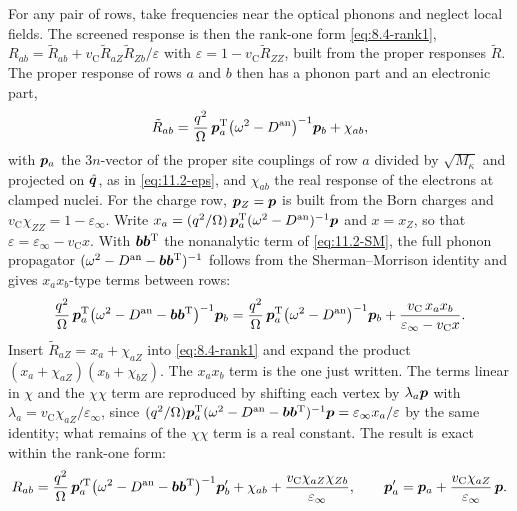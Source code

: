 For any pair of rows, take frequencies near the optical phonons and neglect local fields. The screened response is then the rank-one form \cref{eq:8.4-rank1}, $R_{ab} = \tilde R_{ab} + v_{\mathrm{C}}\tilde R_{aZ}\tilde R_{Zb}/\varepsilon$ with $\varepsilon = 1 - v_{\mathrm{C}}\tilde R_{ZZ}$, built from the proper responses $\tilde R$. The proper response of rows $a$ and $b$ then has a phonon part and an electronic part,
\begin{equation*}
  \tilde R_{ab} = \frac{q^2}{\Omega}\,\bm{p}_a^{\mathrm{T}}\bigl(\omega^2 - D^{\mathrm{an}}\bigr)^{-1}\bm{p}_b + \chi_{ab} ,
\end{equation*}
with $\bm{p}_a$ the $3n$-vector of the proper site couplings of row $a$ divided by $\sqrt{M_\kappa}$ and projected on $\hat{\bm{q}}$, as in \cref{eq:11.2-eps}, and $\chi_{ab}$ the real response of the electrons at clamped nuclei. For the charge row, $\bm{p}_Z = \bm{p}$ is built from the Born charges and $v_{\mathrm{C}}\chi_{ZZ} = 1 - \varepsilon_\infty$. Write $x_a = (q^2/\Omega)\,\bm{p}_a^{\mathrm{T}}(\omega^2 - D^{\mathrm{an}})^{-1}\bm{p}$ and $x = x_Z$, so that $\varepsilon = \varepsilon_\infty - v_{\mathrm{C}}x$. With $\bm{b}\bm{b}^{\mathrm{T}}$ the nonanalytic term of \cref{eq:11.2-SM}, the full phonon propagator $(\omega^2 - D^{\mathrm{an}} - \bm{b}\bm{b}^{\mathrm{T}})^{-1}$ follows from the Sherman--Morrison identity and gives $x_ax_b$-type terms between rows:
\begin{equation*}
  \frac{q^2}{\Omega}\,\bm{p}_a^{\mathrm{T}}\bigl(\omega^2 - D^{\mathrm{an}} - \bm{b}\bm{b}^{\mathrm{T}}\bigr)^{-1}\bm{p}_b = \frac{q^2}{\Omega}\,\bm{p}_a^{\mathrm{T}}\bigl(\omega^2 - D^{\mathrm{an}}\bigr)^{-1}\bm{p}_b + \frac{v_{\mathrm{C}}\,x_ax_b}{\varepsilon_\infty - v_{\mathrm{C}}x} .
\end{equation*}
Insert $\tilde R_{aZ} = x_a + \chi_{aZ}$ into \cref{eq:8.4-rank1} and expand the product $(x_a + \chi_{aZ})(x_b + \chi_{bZ})$. The $x_ax_b$ term is the one just written. The terms linear in $\chi$ and the $\chi\chi$ term are reproduced by shifting each vertex by $\lambda_a\bm{p}$ with $\lambda_a = v_{\mathrm{C}}\chi_{aZ}/\varepsilon_\infty$, since $(q^2/\Omega)\bm{p}_a^{\mathrm{T}}(\omega^2 - D^{\mathrm{an}} - \bm{b}\bm{b}^{\mathrm{T}})^{-1}\bm{p} = \varepsilon_\infty x_a/\varepsilon$ by the same identity; what remains of the $\chi\chi$ term is a real constant. The result is exact within the rank-one form:
\begin{equation}
  R_{ab} = \frac{q^2}{\Omega}\,\bm{p}'^{\mathrm{T}}_a\bigl(\omega^2 - D^{\mathrm{an}} - \bm{b}\bm{b}^{\mathrm{T}}\bigr)^{-1}\bm{p}'_b + \chi_{ab} + \frac{v_{\mathrm{C}}\chi_{aZ}\chi_{Zb}}{\varepsilon_\infty} ,
  \qquad \bm{p}'_a = \bm{p}_a + \frac{v_{\mathrm{C}}\chi_{aZ}}{\varepsilon_\infty}\,\bm{p} .
  \label{eq:11.8-shift}
\end{equation}
